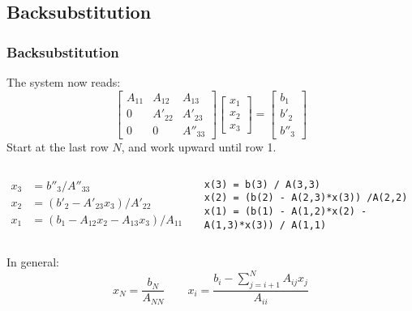 \documentclass[11pt,table,final,xcolor={usenames,dvipsnames,table}]{beamer}
\begin{document}
\subsection*{Backsubstitution}
\begin{frame}[fragile]
  \frametitle{Backsubstitution}
  The system now reads:
  \[
    \begin{bmatrix}
      A_{11} & A_{12} & A_{13}\\ 
      0      & A'_{22} & A'_{23}\\ 
      0 & 0 & A''_{33}
    \end{bmatrix}
    \begin{bmatrix}x_1\\x_2\\x_3\end{bmatrix} = 
    \begin{bmatrix}b_1\\b'_2\\b''_3\end{bmatrix}
  \]
  \pause
  Start at the last row $N$, and work upward until row 1.
  \begin{columns}
    \begin{align*}
     x_3 &= b''_3/A''_{33}\\
     x_2 &= (b'_2 - A'_{23}x_3)/A'_{22}\\
     x_1 &= (b_1 - A_{12}x_2 - A_{13}x_3)/A_{11}
    \end{align*}
    \pause
\begin{lstlisting}
x(3) = b(3) / A(3,3)
x(2) = (b(2) - A(2,3)*x(3)) /A(2,2)
x(1) = (b(1) - A(1,2)*x(2) - A(1,3)*x(3)) / A(1,1)
\end{lstlisting}
\end{columns}
In general:
\[
 x_N = \frac{b_N}{A_{NN}} \qquad x_i = \frac{b_i - \sum_{j=i+1}^{N}A_{ij}x_j}{A_{ii}}
\]
\end{frame}
\end{document}
